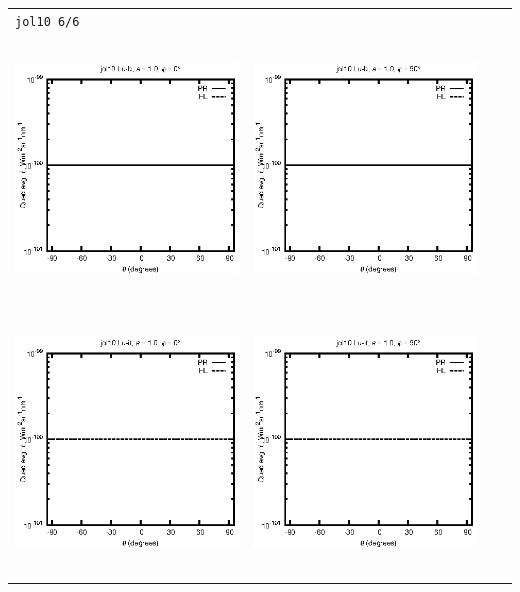 \begin{tabular}{c c c c}
\multicolumn{4}{l}{\texttt{jol10 6/6}} \\
\includegraphics[height=7cm]{../eps/jol10_Lu_b_fwd.eps} &
\includegraphics[height=7cm]{../eps/jol10_Lu_b_cross.eps} \\
\includegraphics[height=7cm]{../eps/jol10_Lu_it_fwd.eps} &
\includegraphics[height=7cm]{../eps/jol10_Lu_it_cross.eps} \\

\end{tabular}
